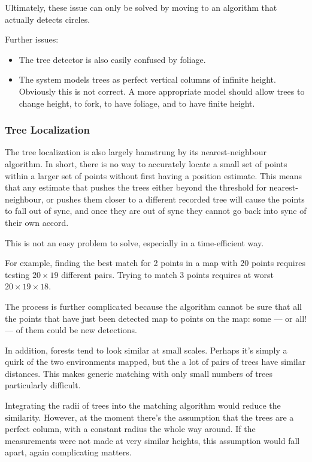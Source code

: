 \documentclass[12pt,oneside,a4paper,draft]{book}
\begin{document}
Ultimately, these issue can only be solved by moving to an algorithm
that actually detects circles.

Further issues:
\begin{itemize}
\item The tree detector is also easily confused by foliage.
\item The system models trees as perfect vertical columns of infinite
  height. Obviously this is not correct. A more appropriate model
  should allow trees to change height, to fork, to have foliage, and
  to have finite height.
\end{itemize}

\subsubsection{Tree Localization}
\label{sec:tree-localization}

The tree localization is also largely hamstrung by its
nearest-neighbour algorithm. In short, there is no way to accurately
locate a small set of points within a larger set of points without
first having a position estimate. This means that any estimate that
pushes the trees either beyond the threshold for nearest-neighbour, or
pushes them closer to a different recorded tree will cause the points
to fall out of sync, and once they are out of sync they cannot go back
into sync of their own accord.

This is not an easy problem to solve, especially in a time-efficient
way. 

For example, finding the best match for 2 points in a map with 20
points requires testing $20 \times 19$ different pairs. Trying to
match 3 points requires at worst $20 \times 19 \times 18$. 

The process is further complicated because the algorithm cannot be
sure that all the points that have just been detected map to points on
the map: some --- or all! --- of them could be new detections.

In addition, forests tend to look similar at small scales. Perhaps
it's simply a quirk of the two environments mapped, but the a lot of
pairs of trees have similar distances. This makes generic matching
with only small numbers of trees particularly difficult.

Integrating the radii of trees into the matching algorithm would
reduce the similarity. However, at the moment there's the assumption
that the trees are a perfect column, with a constant radius the whole
way around. If the measurements were not made at very similar heights,
this assumption would fall apart, again complicating matters.
\end{document}
